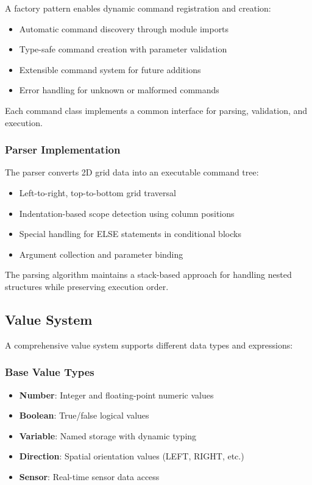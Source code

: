 A factory pattern enables dynamic command registration and creation:

\begin{itemize}
    \item Automatic command discovery through module imports
    \item Type-safe command creation with parameter validation
    \item Extensible command system for future additions
    \item Error handling for unknown or malformed commands
\end{itemize}

Each command class implements a common interface for parsing, validation, and execution.

\subsubsection{Parser Implementation}

The parser converts 2D grid data into an executable command tree:

\begin{itemize}
    \item Left-to-right, top-to-bottom grid traversal
    \item Indentation-based scope detection using column positions
    \item Special handling for ELSE statements in conditional blocks
    \item Argument collection and parameter binding
\end{itemize}

The parsing algorithm maintains a stack-based approach for handling nested structures while preserving execution order.

\subsection{Value System}

A comprehensive value system supports different data types and expressions:

\subsubsection{Base Value Types}

\begin{itemize}
    \item \textbf{Number}: Integer and floating-point numeric values
    \item \textbf{Boolean}: True/false logical values
    \item \textbf{Variable}: Named storage with dynamic typing
    \item \textbf{Direction}: Spatial orientation values (LEFT, RIGHT, etc.)
    \item \textbf{Sensor}: Real-time sensor data access
\end{itemize}

